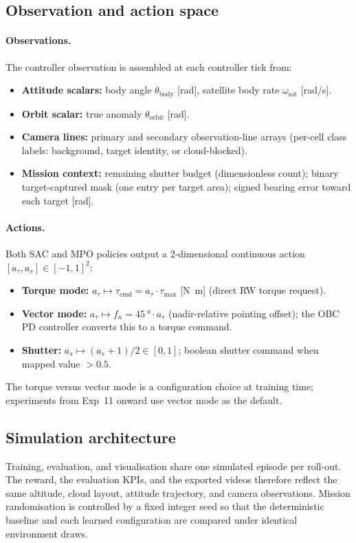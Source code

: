 \subsection{Observation and action space}
\label{sec:obs-action}

\paragraph{Observations.}
The controller observation is assembled at each controller tick from:
\begin{itemize}
  \item \textbf{Attitude scalars:} body angle $\theta_\text{body}$ [rad], satellite body rate $\omega_\text{sat}$ [rad/s].
  \item \textbf{Orbit scalar:} true anomaly $\theta_\text{orbit}$ [rad].
  \item \textbf{Camera lines:} primary and secondary observation-line arrays (per-cell class labels: background, target identity, or cloud-blocked).
  \item \textbf{Mission context:} remaining shutter budget (dimensionless count); binary target-captured mask (one entry per target area); signed bearing error toward each target [rad].
\end{itemize}

\paragraph{Actions.}
Both SAC and MPO policies output a 2-dimensional continuous action $[a_\tau, a_s]\in[-1,1]^2$:
\begin{itemize}
  \item \textbf{Torque mode:} $a_\tau\mapsto\tau_\text{cmd} = a_\tau\cdot\tau_\text{max}$ [\si{N.m}] (direct RW torque request).
  \item \textbf{Vector mode:} $a_\tau\mapsto f_n = \SI{45}{\degree}\cdot a_\tau$ (nadir-relative pointing offset); the OBC PD controller converts this to a torque command.
  \item \textbf{Shutter:} $a_s\mapsto (a_s+1)/2\in[0,1]$; boolean shutter command when mapped value $> 0.5$.
\end{itemize}
The torque versus vector mode is a configuration choice at training time;
experiments from Exp~11 onward use vector mode as the default.

\subsection{Simulation architecture}
\label{sec:arch}

Training, evaluation, and visualisation share one simulated episode per roll-out.
The reward, the evaluation KPIs, and the exported videos therefore reflect the same altitude, cloud layout, attitude trajectory, and camera observations.
Mission randomisation is controlled by a fixed integer seed so that the deterministic baseline and each learned configuration are compared under identical environment draws.
